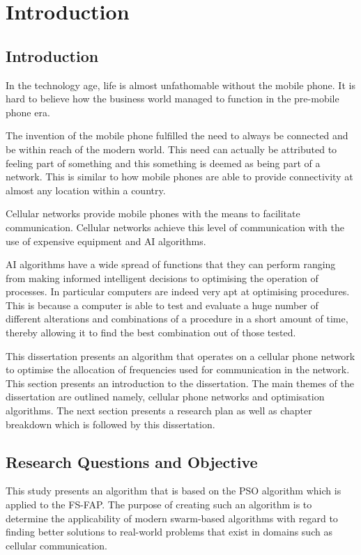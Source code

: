 \chapter{Introduction}
\section{Introduction}
In the technology age, life is almost unfathomable without the mobile phone. It is hard to believe how the business world managed to function in the pre-mobile phone era.

The invention of the mobile phone fulfilled the need to always be connected and be within reach of the modern world. This need can actually be attributed to feeling part of something and this something is deemed as being part of a network. This is similar to how mobile phones are able to provide connectivity at almost any location within a country.

Cellular networks provide mobile phones with the means to facilitate communication. Cellular networks achieve this level of communication with the use of expensive equipment and \gls{AI} algorithms.

\gls{AI} algorithms have a wide spread of functions that they can perform ranging from making informed intelligent decisions to optimising the operation of processes. In particular computers are indeed very apt at optimising procedures. This is because a computer is able to test and evaluate a huge number of different alterations and combinations of a procedure in a short amount of time, thereby allowing it to find the best combination out of those tested.

This dissertation presents an algorithm that operates on a cellular phone network to optimise the allocation of frequencies used for communication in the network.
This section presents an introduction to the dissertation. The main themes of the dissertation are outlined namely, cellular phone networks and optimisation algorithms. The next section presents a research plan as well as chapter breakdown which is followed by this dissertation.
\section{Research Questions and Objective}
This study presents an algorithm that is based on the \gls{PSO} algorithm which is applied to the \gls{FS-FAP}. The purpose of creating such an algorithm is to determine the applicability of modern swarm-based algorithms with regard to finding better solutions to real-world problems that exist in domains such as cellular communication.

